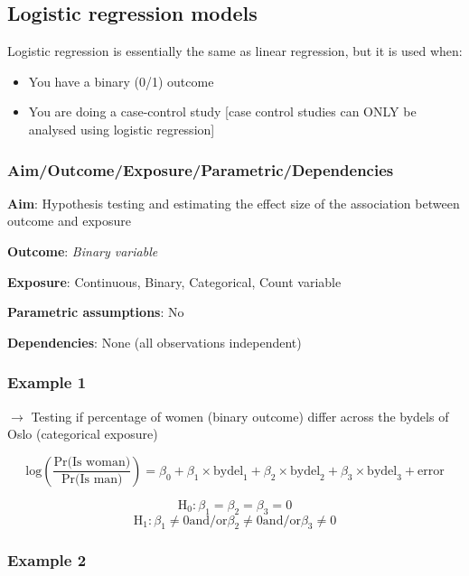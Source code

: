 \documentclass[12pt,]{article}
\providecommand{\tightlist}{%
  \setlength{\itemsep}{0pt}\setlength{\parskip}{0pt}}
\begin{document}
\subsection{Logistic regression
models}\label{logistic-regression-models}

Logistic regression is essentially the same as linear regression, but it
is used when:

\begin{itemize}
\tightlist
\item
  You have a binary (0/1) outcome
\item
  You are doing a case-control study {[}case control studies can ONLY be
  analysed using logistic regression{]}
\end{itemize}

\subsubsection{Aim/Outcome/Exposure/Parametric/Dependencies}\label{aimoutcomeexposureparametricdependencies-6}

\textbf{Aim}: Hypothesis testing and estimating the effect size of the
association between outcome and exposure

\textbf{Outcome}: \emph{Binary variable}

\textbf{Exposure}: Continuous, Binary, Categorical, Count variable

\textbf{Parametric assumptions}: No

\textbf{Dependencies}: None (all observations independent)

\subsubsection{Example 1}\label{example-1-7}

\(\rightarrow\) Testing if percentage of women (binary outcome) differ
across the bydels of Oslo (categorical exposure)

\[\text{log}\left(\frac{\text{Pr(Is woman)}}{\text{Pr(Is man)}}\right) = \beta_0 + \beta_1 \times \text{bydel}_1 + \beta_2 \times \text{bydel}_2 + \beta_3 \times \text{bydel}_3 + \text{error}\]

\[\text{H}_0: \beta_1 = \beta_2 = \beta_3 = 0\]
\[\text{H}_1: \beta_1 \ne 0 \text{and/or} \beta_2 \ne 0 \text{and/or} \beta_3 \ne 0\]

\subsubsection{Example 2}\label{example-2-7}
\end{document}
